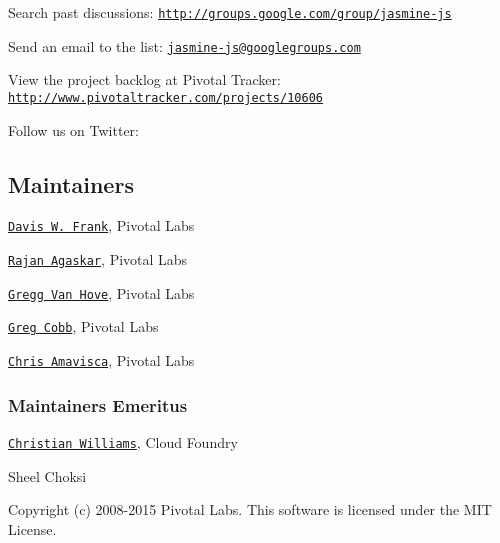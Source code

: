 \begin{DoxyItemize}
\item Search past discussions\+: \href{http://groups.google.com/group/jasmine-js}{\tt http\+://groups.\+google.\+com/group/jasmine-\/js}
\item Send an email to the list\+: \href{mailto:jasmine-js@googlegroups.com}{\tt jasmine-\/js@googlegroups.\+com}
\item View the project backlog at Pivotal Tracker\+: \href{http://www.pivotaltracker.com/projects/10606}{\tt http\+://www.\+pivotaltracker.\+com/projects/10606}
\item Follow us on Twitter\+: \href{http://twitter.com/JasmineBDD}{\tt }
\end{DoxyItemize}

\subsection*{Maintainers}


\begin{DoxyItemize}
\item \href{mailto:dwfrank@pivotal.io}{\tt Davis W. Frank}, Pivotal Labs
\item \href{mailto:rajan@pivotal.io}{\tt Rajan Agaskar}, Pivotal Labs
\item \href{mailto:gvanhove@pivotal.io}{\tt Gregg Van Hove}, Pivotal Labs
\item \href{mailto:gcobb@pivotal.io}{\tt Greg Cobb}, Pivotal Labs
\item \href{mailto:camavisca@pivotal.io}{\tt Chris Amavisca}, Pivotal Labs
\end{DoxyItemize}

\subsubsection*{Maintainers Emeritus}


\begin{DoxyItemize}
\item \href{mailto:antixian666@gmail.com}{\tt Christian Williams}, Cloud Foundry
\item Sheel Choksi
\end{DoxyItemize}

Copyright (c) 2008-\/2015 Pivotal Labs. This software is licensed under the M\+I\+T License. 
